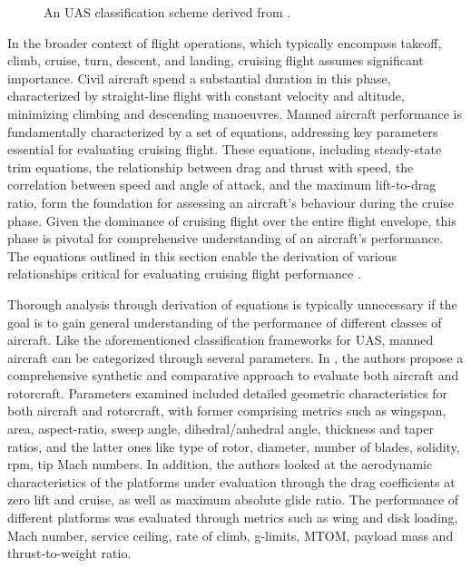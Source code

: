 \documentclass[english, 12pt, a4paper, elec, utf8, a-1b, online]{aaltothesis}
\begin{document}
\begin{figure}[h]
  \centering
  
  \caption{An UAS classification scheme derived from \cite{hassanalian2017classifications}.}
  \label{fig-hassanalian-uas-classification}
\end{figure}

In the broader context of flight operations, which typically encompass takeoff, climb, cruise, turn, descent, and landing, cruising flight assumes significant importance.
Civil aircraft spend a substantial duration in this phase, characterized by straight-line flight with constant velocity and altitude, minimizing climbing and descending manoeuvres.
Manned aircraft performance is fundamentally characterized by a set of equations, addressing key parameters essential for evaluating cruising flight.
These equations, including steady-state trim equations, the relationship between drag and thrust with speed, the correlation between speed and angle of attack, and the maximum lift-to-drag ratio, form the foundation for assessing an aircraft's behaviour during the cruise phase.
Given the dominance of cruising flight over the entire flight envelope, this phase is pivotal for comprehensive understanding of an aircraft's performance.
The equations outlined in this section enable the derivation of various relationships critical for evaluating cruising flight performance \cite{sadraey2017ch5}.

Thorough analysis through derivation of equations is typically unnecessary if the goal is to gain general understanding of the performance of different classes of aircraft.
Like the aforementioned classification frameworks for UAS, manned aircraft can be categorized through several parameters.
In \cite{filippone2000data}, the authors propose a comprehensive synthetic and comparative approach to evaluate both aircraft and rotorcraft.
Parameters examined included detailed geometric characteristics for both aircraft and rotorcraft, with former comprising metrics such as wingspan, area, aspect-ratio, sweep angle, dihedral/anhedral angle, thickness and taper ratios, and the latter ones like type of rotor, diameter, number of blades, solidity, rpm, tip Mach numbers.
In addition, the authors looked at the aerodynamic characteristics of the platforms under evaluation through the drag coefficients at zero lift and cruise, as well as maximum absolute glide ratio.
The performance of different platforms was evaluated through metrics such as wing and disk loading, Mach number, service ceiling, rate of climb, g-limits, MTOM, payload mass and thrust-to-weight ratio.
\end{document}
